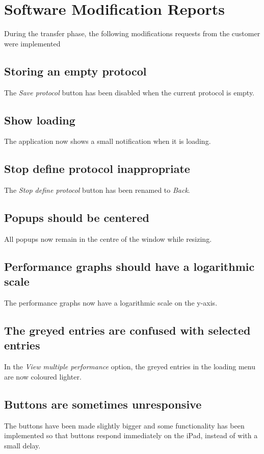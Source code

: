 \chapter{Software Modification Reports}
\label{chap:implemented}
During the transfer phase, the following modifications requests from the customer were implemented

\section*{Storing an empty protocol}
The \emph{Save protocol} button has been disabled when the current protocol is empty.

\section*{Show loading}
The application now shows a small notification when it is loading.

\section*{Stop define protocol inappropriate}
The \emph{Stop define protocol} button has been renamed to \emph{Back}.

\section*{Popups should be centered}
All popups now remain in the centre of the window while resizing.

\section*{Performance graphs should have a logarithmic scale}
The performance graphs now have a logarithmic scale on the y-axis.

\section*{The greyed entries are confused with selected entries}
In the \emph{View multiple performance} option, the greyed entries in the loading menu are now coloured lighter.

\section*{Buttons are sometimes unresponsive}
The buttons have been made slightly bigger and some functionality has been implemented so that buttons respond immediately on the iPad, instead of with a small delay.

